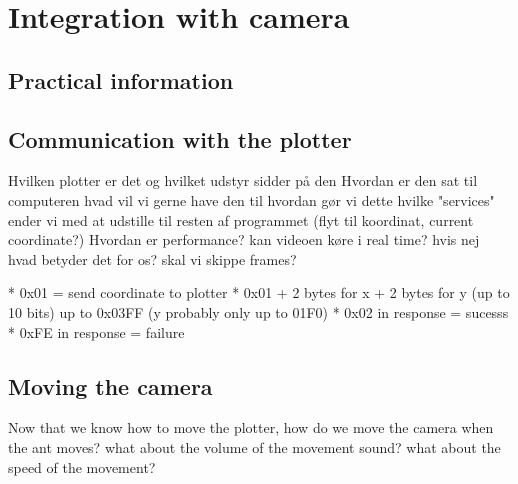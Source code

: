 
\section{Integration with camera}

\subsection{Practical information}

\subsection{Communication with the plotter}
Hvilken plotter er det og hvilket udstyr sidder på den
Hvordan er den sat til computeren
hvad vil vi gerne have den til
hvordan gør vi dette
hvilke "services" ender vi med at udstille til resten af programmet (flyt til koordinat, current coordinate?)
Hvordan er performance? kan videoen køre i real time? hvis nej hvad betyder det for os? skal vi skippe frames?

*   0x01 = send coordinate to plotter
 *   0x01 + 2 bytes for x + 2 bytes for y (up to 10 bits) up to 0x03FF (y probably only up to 01F0)
 *   0x02 in response = sucesss
 *   0xFE in response = failure
 
\subsection{Moving the camera}
Now that we know how to move the plotter, how do we move the camera when the ant moves?
what about the volume of the movement sound?
what about the speed of the movement?
